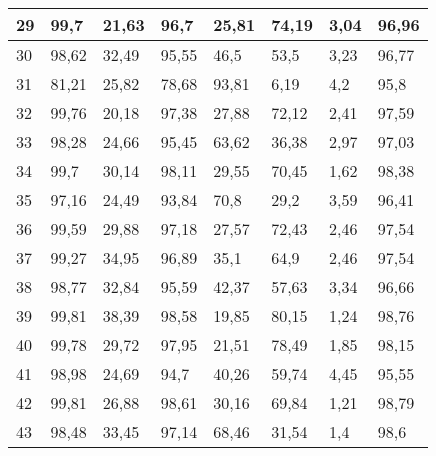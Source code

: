 \begin{longtable}[c]{|l|l|l|l|l|l|l|l|}
29              & 99,7         & 21,63        & 96,7        & 25,81         & 74,19         & 3,04          & 96,96         \\ \hline
30              & 98,62        & 32,49        & 95,55       & 46,5          & 53,5          & 3,23          & 96,77         \\ \hline
31              & 81,21        & 25,82        & 78,68       & 93,81         & 6,19          & 4,2           & 95,8          \\ \hline
32              & 99,76        & 20,18        & 97,38       & 27,88         & 72,12         & 2,41          & 97,59         \\ \hline
33              & 98,28        & 24,66        & 95,45       & 63,62         & 36,38         & 2,97          & 97,03         \\ \hline
34              & 99,7         & 30,14        & 98,11       & 29,55         & 70,45         & 1,62          & 98,38         \\ \hline
35              & 97,16        & 24,49        & 93,84       & 70,8          & 29,2          & 3,59          & 96,41         \\ \hline
36              & 99,59        & 29,88        & 97,18       & 27,57         & 72,43         & 2,46          & 97,54         \\ \hline
37              & 99,27        & 34,95        & 96,89       & 35,1          & 64,9          & 2,46          & 97,54         \\ \hline
38              & 98,77        & 32,84        & 95,59       & 42,37         & 57,63         & 3,34          & 96,66         \\ \hline
39              & 99,81        & 38,39        & 98,58       & 19,85         & 80,15         & 1,24          & 98,76         \\ \hline
40              & 99,78        & 29,72        & 97,95       & 21,51         & 78,49         & 1,85          & 98,15         \\ \hline
41              & 98,98        & 24,69        & 94,7        & 40,26         & 59,74         & 4,45          & 95,55         \\ \hline
42              & 99,81        & 26,88        & 98,61       & 30,16         & 69,84         & 1,21          & 98,79         \\ \hline
43              & 98,48        & 33,45        & 97,14       & 68,46         & 31,54         & 1,4           & 98,6          \\ \hline

\end{longtable}
